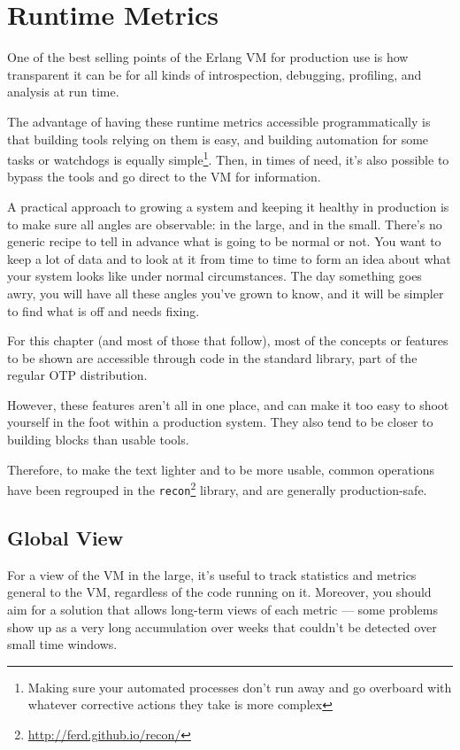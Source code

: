 \documentclass[11pt, oneside]{book}   	%
\newcommand{\otpapp}[1]{\Verb`#1`}
\begin{document}
\chapter{Runtime Metrics}
\label{chap:runtime-metrics}

One of the best selling points of the Erlang VM for production use is how transparent it can be for all kinds of introspection, debugging, profiling, and analysis at run time.

The advantage of having these runtime metrics accessible programmatically is that building tools relying on them is easy, and building automation for some tasks or watchdogs is equally simple\footnote{Making sure your automated processes don't run away and go overboard with whatever corrective actions they take is more complex}. Then, in times of need, it's also possible to bypass the tools and go direct to the VM for information.

A practical approach to growing a system and keeping it healthy in production is to make sure all angles are observable: in the large, and in the small. There's no generic recipe to tell in advance what is going to be normal or not. You want to keep a lot of data and to look at it from time to time to form an idea about what your system looks like under normal circumstances. The day something goes awry, you will have all these angles you've grown to know, and it will be simpler to find what is off and needs fixing.

For this chapter (and most of those that follow), most of the concepts or features to be shown are accessible through code in the standard library, part of the regular OTP distribution. 

However, these features aren't all in one place, and can make it too easy to shoot yourself in the foot within a production system. They also tend to be closer to building blocks than usable tools.

Therefore, to make the text lighter and to be more usable, common operations have been regrouped in the \otpapp{recon}\footnote{\href{http://ferd.github.io/recon/}{http://ferd.github.io/recon/}} library, and are generally production-safe.

\section{Global View}
\label{sec:global-view}

For a view of the VM in the large, it's useful to track statistics and metrics general to the VM, regardless of the code running on it. Moreover, you should aim for a solution that allows long-term views of each metric — some problems show up as a very long accumulation over weeks that couldn't be detected over small time windows.
\end{document}
